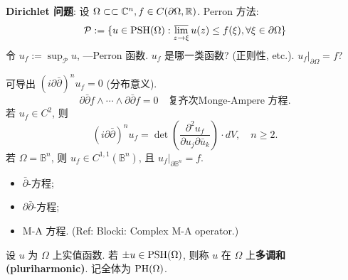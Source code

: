 \noindent\textbf{Dirichlet 问题}: 设 $\Omega \subset \subset {\mathbb C}^n, f \in C(\partial \Omega ,{\mathbb R})$. Perron 方法: 
$$ \mathcal{P}:=\{u \in \operatorname{PSH} (\Omega ):\varlimsup_{z \to \xi }u(z) \leq f(\xi ), \forall \xi \in \partial \Omega \} $$
令 $u_f:=\sup_{\mathcal{P}}u$, ---Perron 函数. 
$u_f$ 是哪一类函数? (正则性, etc.).  $u_f|_{\partial \Omega }=f$? 

\begin{remark}
  可导出 $\left( i \partial \bar{\partial }  \right)^n u_f=0$ (分布意义). 
  $$ \partial \bar{\partial } f \wedge \cdots \wedge \partial \bar{\partial } f =0 \quad \text{复齐次Monge-Ampere 方程}.$$
  若 $u_f \in C^2$, 则 
  $$ \left( i \partial \bar{\partial }  \right)^n u_f= \det \left( \frac{\partial^2 u_f }{\partial u_j \partial \bar{u}_k} \right) \cdot dV, \quad n \geq 2. $$ 
  若 $\Omega =\mathbb{B}^n$, 则 $u_f \in C^{1,1}(\mathbb{B}^n)$, 且 $u_f|_{\partial \mathbb{B}^n}=f$.   
\end{remark}
\begin{itemize}
   \item $\bar{\partial }$-方程;
   \item $\partial \bar{\partial }$-方程;
   \item M-A 方程. (Ref: Blocki: Complex M-A operator.)  
\end{itemize}


\begin{definition}
  设 $u$ 为 $\Omega $ 上实值函数. 若 $\pm u \in \operatorname{PSH}(\Omega )$, 则称 $u$ 在 $\Omega $ 上\textbf{多调和(pluriharmonic)}. 记全体为 $\operatorname{PH} (\Omega )$.     
\end{definition}

